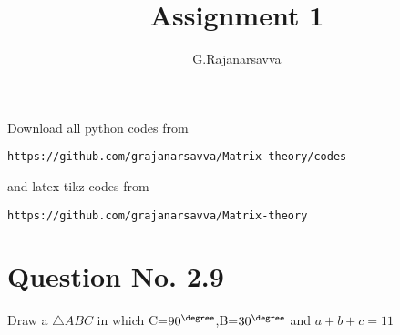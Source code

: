\documentclass[journal,12pt,twocolumn]{IEEEtran}
\begin{document}
     \def\rightbox#1{\makebox[0in][r]{#1}}
     \def\centbox#1{\makebox[0in]{#1}}
     \def\topbox#1{\raisebox{-\baselineskip}[0in][0in]{#1}}
     \def\midbox#1{\raisebox{-0.5\baselineskip}[0in][0in]{#1}}
\vspace{3cm}
\title{Assignment 1}
\author{G.Rajanarsavva}
\maketitle
\newpage
\bigskip
\renewcommand{\thefigure}{\theenumi}
\renewcommand{\thetable}{\theenumi}
Download all python codes from 
\begin{lstlisting}
https://github.com/grajanarsavva/Matrix-theory/codes
\end{lstlisting}
%
and latex-tikz codes from 
%
\begin{lstlisting}
https://github.com/grajanarsavva/Matrix-theory
\end{lstlisting}
%
\section{Question No. 2.9}
Draw a $\triangle ABC$ in which \angle C=$90^\degree$,\angle B=$30^\degree$ and $a+b+c=11$
\end{document}
